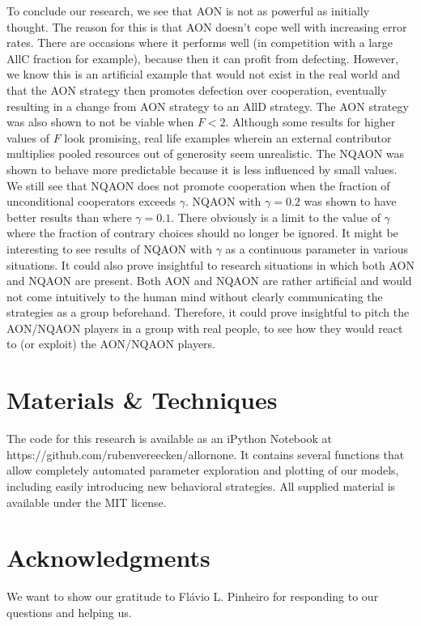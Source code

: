 \documentclass[letterpaper]{article}
\begin{document}
To conclude our research, we see that AON is not as powerful as initially thought. The reason for this is that AON doesn't cope well with increasing error rates. There are occasions where it performs well (in competition with a large AllC fraction for example), because then it can profit from defecting. However, we know this is an artificial example that would not exist in the real world and that the AON strategy then promotes defection over cooperation, eventually resulting in a change from AON strategy to an AllD strategy. The AON strategy was also shown to not be viable when $F<2$. Although some results for higher values of $F$ look promising, real life examples wherein an external contributor multiplies pooled resources out of generosity seem unrealistic.
The NQAON was shown to behave more predictable because it is less influenced by small values. We still see that NQAON does not promote cooperation when the fraction of unconditional cooperators exceeds $\gamma$.
NQAON with $\gamma = 0.2$ was shown to have better results than where $\gamma=0.1$. There obviously is a limit to the value of $\gamma$ where the fraction of contrary choices should no longer be ignored. It might be interesting to see results of NQAON with $\gamma$ as a continuous parameter in various situations. It could also prove insightful to research situations in which both AON and NQAON are present.
Both AON and NQAON are rather artificial and would not come intuitively to the human mind without clearly communicating the strategies as a group beforehand. Therefore, it could prove insightful to pitch the AON/NQAON players in a group with real people, to see how they would react to (or exploit) the AON/NQAON players.

\section{Materials \& Techniques}
The code for this research is available as an iPython Notebook at https://github.com/rubenvereecken/allornone. It contains several functions that allow completely automated parameter exploration and plotting of our models, including easily introducing new behavioral strategies. All supplied material is available under the MIT license. 

\section{Acknowledgments}
We want to show our gratitude to Fl\'{a}vio L. Pinheiro for responding to our questions and helping us.


\footnotesize



\end{document}
